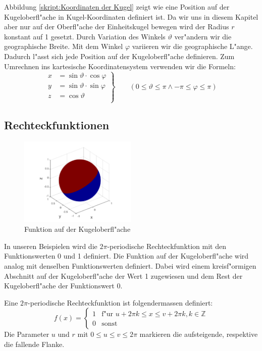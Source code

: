 \begin{refsection}
Abbildung \ref{skript:Koordinaten der Kugel} 
zeigt wie eine Position auf der Kugeloberfl"ache in
Kugel-Koordinaten definiert ist. 
Da wir uns in diesem Kapitel aber nur auf der Oberfl"ache der 
Einheitskugel bewegen wird der Radius $r$ konstant auf 1 gesetzt. 
Durch Variation des Winkels $\vartheta$ ver"andern wir die 
geographische Breite. 
Mit dem Winkel $\varphi$ variieren wir die geographische 
L"ange. 
Dadurch l"asst sich jede Position auf der Kugeloberfl"ache definieren. 
Zum Umrechnen ins kartesische Koordinatensystem verwenden wir die 
Formeln:
\[
\left.\begin{aligned}
x& = \sin\vartheta \cdot \cos\varphi\\
y& = \sin\vartheta \cdot \sin\varphi\\
z& = \cos\vartheta\\      
\end{aligned}
\right\}
\qquad (0 \leq \vartheta \leq \pi \wedge {-\pi} \leq \varphi \leq \pi)
\]

\subsection{Rechteckfunktionen}
\begin{figure}%
\centering
\includegraphics[width=0.5\textwidth]{kugel/Funktion.pdf}
\caption{Funktion auf der Kugeloberfl"ache
\label{skript:Funktion auf Kugeloberfl"ache}}
\end{figure}
In unseren Beispielen wird die $2\pi$-periodische Rechteckfunktion
mit den Funktionswerten 0 und 1 definiert. 
Die Funktion auf der Kugeloberfl"ache wird analog 
mit denselben Funktionswerten definiert. 
Dabei wird einem kreisf"ormigen Abschnitt auf der Kugeloberfl"ache 
der Wert 1 zugewiesen und dem Rest der Kugeloberfl"ache der 
Funktionswert 0. 

Eine $2\pi$-periodische Rechteckfunktion ist folgendermassen definiert:
\begin{equation}
f(x) =
\begin{cases}
1 & \text{f"ur } u+2\pi k \leq x \leq v + 2\pi k , k \in \mathbb{Z}
\\
0 & \text{sonst } 
\end{cases}
\label{skript:Rechteckfunktion Formel}
\end{equation}
Die Parameter $u$ und $r$ mit $0 \leq u \leq v \leq 2\pi$ markieren
die aufsteigende, respektive die fallende Flanke. 


\end{refsection}
